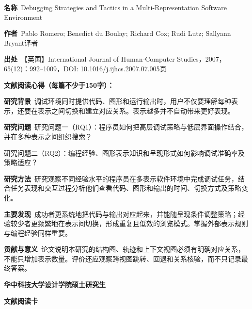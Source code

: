 \vspace{0.25em}
\noindent\underline{}\par
\vspace{0.35em}
\noindent\textbf{名称}\ Debugging Strategies and Tactics in a Multi-Representation Software Environment\par
\noindent\textbf{作者}\ Pablo Romero; Benedict du Boulay; Richard Cox; Rudi Lutz; Sallyann Bryant\quad 译者\par
\noindent\textbf{出处}\ 【英国】International Journal of Human-Computer Studies，2007，65(12)：992–1009，DOI: 10.1016/j.ijhcs.2007.07.005\quad 页\par
\vspace{0.35em}
\noindent\textbf{文献阅读心得（每篇不少于150字）：}\par
\noindent\textbf{研究背景}\ 调试环境同时提供代码、图形和运行输出时，用户不仅要理解每种表示，还要在表示之间切换和建立对应关系。表示越多并不自动带来更好表现。\par
\noindent\textbf{研究问题}\ 研究问题一（RQ1）：程序员如何把高层调试策略与低层界面操作结合，并在多种表示之间组织搜索？\par
研究问题二（RQ2）：编程经验、图形表示知识和呈现形式如何影响调试准确率及策略适应？\par
\noindent\textbf{研究方法}\ 研究观察不同经验水平的程序员在多表示软件环境中完成调试任务，结合任务表现和交互过程分析他们查看代码、图形和输出的时间、切换方式及策略变化。\par
\noindent\textbf{主要发现}\ 成功者更系统地把代码与输出对应起来，并能随呈现条件调整策略；经验较少者更频繁地在表示间切换，形成重复且低效的浏览模式。掌握外部表示规则与编程经验同样重要。\par
\noindent\textbf{贡献与意义}\ 论文说明本研究的结构图、轨迹和上下文视图必须有明确对应关系，不能只增加表示数量。评价还应观察跨视图跳转、回退和关系核验，而不只记录最终答案。\par
\clearpage
\begin{center}
{\songti\bfseries\fontsize{18.5pt}{27.75pt}\selectfont 华中科技大学设计学院硕士研究生\par}
{\songti\bfseries\fontsize{18.5pt}{27.75pt}\selectfont 文献阅读卡\par}
\end{center}
\vspace{0.25em}
\noindent\underline{}\par
